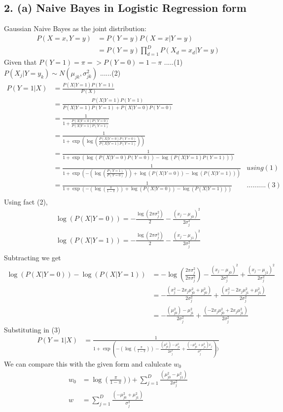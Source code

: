 \documentclass[10pt,letterpaper]{article}
\begin{document}
\subsection{2. (a) Naive Bayes in Logistic Regression form }
Gaussian Naive Bayes as the joint distribution:
\begin{align*}
P(X=x,Y=y)&=P(Y=y)P(X=x|Y=y)\\
&=P(Y=y)\prod_{d=1}^D P(X_d=x_d|Y=y)
\end{align*}
Given that $P(Y=1)=\pi => P(Y=0)=1-\pi    $     .....(1)\\
$P(X_j|Y=y_k)  \sim N(\mu_{jk},\sigma_{jk}^2)	$ ......(2)
\begin{align*}
P(Y=1|X) &= \frac{P(X|Y=1)P(Y=1)}{P(X)}\\
&= \frac{P(X|Y=1)P(Y=1)}{P(X|Y=1)P(Y=1)+P(X|Y=0)P(Y=0)}\\
&= \frac{1}{1+\frac{P(X|Y=0)P(Y=0)}{P(X|Y=1)P(Y=1)}}\\
&= \frac{1}{1+\exp(\log(\frac{P(X|Y=0)P(Y=0)}{P(X|Y=1)P(Y=1)}))}\\
&= \frac{1}{1+\exp(\log({P(X|Y=0)P(Y=0)})-\log({P(X|Y=1)P(Y=1)}))}\\
&= \frac{1}{1+\exp(-(\log(\frac{P(Y=1)}{P(Y=0)}))+\log(P(X|Y=0))-\log(P(X|Y=1)))} & using (1)\\
&= \frac{1}{1+\exp(-(\log(\frac{\pi}{1-\pi}))+\log(P(X|Y=0))-\log(P(X|Y=1)))} & ..........(3)\\
\end{align*}
Using fact (2),
\begin{align*}
\log(P(X|Y=0))= -\frac{\log(2\pi \sigma_{j}^2)}{2} - \frac{(x_j-\mu_{j0})^2}{2\sigma_{j}^2}\\
\log(P(X|Y=1))= -\frac{\log(2\pi \sigma_{j}^2)}{2} - \frac{(x_j-\mu_{j1})^2}{2\sigma_{j}^2}\\
\end{align*}
Subtracting we get
\begin{align*}
\log(P(X|Y=0))- \log(P(X|Y=1))&= -\log(\frac{2\pi \sigma_{j}^2}{2\pi \sigma_{j}^2}) - \frac{(x_j-\mu_{j0})^2}{2\sigma_{j}^2}  + \frac{(x_j-\mu_{j1})^2}{2\sigma_{j}^2}\\
&=- \frac{(x_j^2 - 2x_j\mu_{j0}^2+\mu_{j0}^2)}{2\sigma_{j}^2}  + \frac{(x_j^2 - 2x_j\mu_{j1}^2+\mu_{j1}^2)}{2\sigma_{j}^2}\\
&= -\frac{(\mu_{j0}^2)-\mu_{j1}^2}{2\sigma_{j}^2}  + \frac{(-2x_j\mu_{j0}^2 + 2x_j\mu_{j1}^2)}{2\sigma_{j}^2} 
\end{align*}
Substituting in (3) 
\begin{align*}
P(Y=1|X) &= \frac{1}{1+\exp(-(\log(\frac{\pi}{1-\pi})) -\frac{(\mu_{j0}^2)-\mu_{j1}^2}{2\sigma_{j}^2}  + \frac{(-\mu_{j0}^2 + \mu_{j1}^2)x_j}{\sigma_{j}^2}   ))}
\end{align*}
We can compare this with the given form and calulcate $w_0$
\begin{align*}
w_0 &=\log(\frac{\pi}{1-\pi})) +\sum_{j=1}^D\frac{(\mu_{j0}^2-\mu_{j1}^2)}{2\sigma_{j}^2} \\ 
w &= \sum_{j=1}^D \frac{(-\mu_{j0}^2 + \mu_{j1}^2)}{\sigma_{j}^2} 
\end{align*}
\end{document}
